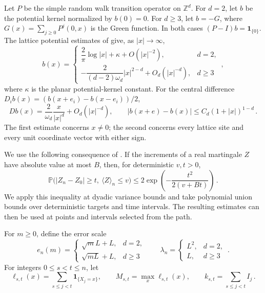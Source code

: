 \documentclass[11pt]{amsart}
\theoremstyle{plain}
\theoremstyle{definition}
\newcommand{\Z}{\mathbb Z}
\renewcommand{\P}{\mathbb P}
\newcommand{\ind}{\mathbf 1}
\begin{document}
Let $P$ be the simple random walk transition operator on $\Z^d$.
For $d=2$, let $b$ be the potential kernel normalized by $b(0)=0$.
For $d\geq3$, let $b=-G$, where
$G(x)=\sum_{j\geq0}P^j(0,x)$ is the Green function.
In both cases $(P-I)b=\ind_{\{0\}}$.
The lattice potential estimates of
\citet[Theorem~4.3.1, Corollary~4.3.3, and Theorem~4.4.4]{LawlerLimic2010}
give, as $|x|\to\infty$,
\begin{equation}\label{eq:kernel-asymptotics}
b(x)=\begin{cases}
\dfrac2\pi\log|x|+\kappa+O(|x|^{-2}),&d=2,\\[3pt]
-\dfrac{2}{(d-2)\omega_d}|x|^{2-d}+O_d(|x|^{-d}),&d\geq3
\end{cases}\, ,
\end{equation}
where $\kappa$ is the planar potential-kernel constant.
For the central difference $D_i b(x)=(b(x+e_i)-b(x-e_i))/2$,
\begin{equation}\label{eq:gradient}
Db(x)=\frac2{\omega_d}\frac{x}{|x|^d}+O_d(|x|^{-d}) ,
\qquad |b(x+e)-b(x)|\leq C_d(1+|x|)^{1-d}\, .
\end{equation}
The first estimate concerns $x\ne0$; the second concerns every lattice
site and every unit coordinate vector with either sign.

We use the following consequence of \citet[Theorem~1.6]{Freedman1975}.
If the increments of a real martingale $Z$ have absolute value at most
$B$, then, for deterministic $v,t>0$,
\begin{equation}\label{eq:freedman}
\P\bigl(|Z_n-Z_0|\geq t,\ \langle Z\rangle_n\leq v\bigr)
\leq2\exp\left(-\frac{t^2}{2(v+Bt)}\right)\, .
\end{equation}
We apply this inequality at dyadic variance bounds and take polynomial
union bounds over deterministic targets and time intervals.
The resulting estimates can then be used at points and intervals
selected from the path.

For $m\geq0$, define the error scale
\begin{equation}\label{eq:error-scale}
e_n(m)=\begin{cases}
\sqrt m L+L,&d=2,\\
\sqrt{mL}+L,&d\geq3
\end{cases}
\qquad
\lambda_n=\begin{cases}L^2,&d=2,\\L,&d\geq3
\end{cases}\, .
\end{equation}
For integers $0\leq s<t\leq n$, let
\begin{equation}\label{eq:interval-def}
\ell_{s,t}(x)=\sum_{s\leq j<t}\ind_{\{X_j=x\}} ,\qquad
M_{s,t}=\max_x\ell_{s,t}(x) ,\qquad
k_{s,t}=\sum_{s\leq j<t}I_j\, .
\end{equation}
\end{document}
